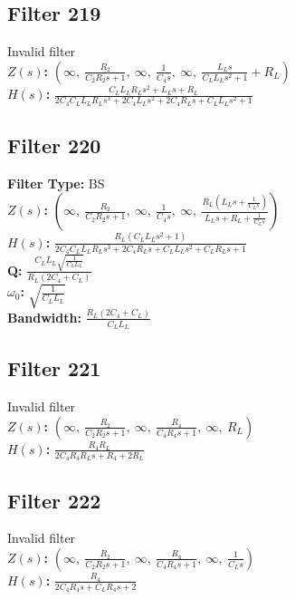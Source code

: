 \documentclass{article}
\begin{document}
\subsection*{Filter 219}
Invalid filter \\ 
\textbf{$Z(s)$:} $\left( \infty, \  \frac{R_{2}}{C_{2} R_{2} s + 1}, \  \infty, \  \frac{1}{C_{4} s}, \  \infty, \  \frac{L_{L} s}{C_{L} L_{L} s^{2} + 1} + R_{L}\right)$ \\ 
\textbf{$H(s)$:} $\frac{C_{L} L_{L} R_{L} s^{2} + L_{L} s + R_{L}}{2 C_{4} C_{L} L_{L} R_{L} s^{3} + 2 C_{4} L_{L} s^{2} + 2 C_{4} R_{L} s + C_{L} L_{L} s^{2} + 1}$ \\ 
\subsection*{Filter 220}
\textbf{Filter Type:} BS \\ 
\textbf{$Z(s)$:} $\left( \infty, \  \frac{R_{2}}{C_{2} R_{2} s + 1}, \  \infty, \  \frac{1}{C_{4} s}, \  \infty, \  \frac{R_{L} \left(L_{L} s + \frac{1}{C_{L} s}\right)}{L_{L} s + R_{L} + \frac{1}{C_{L} s}}\right)$ \\ 
\textbf{$H(s)$:} $\frac{R_{L} \left(C_{L} L_{L} s^{2} + 1\right)}{2 C_{4} C_{L} L_{L} R_{L} s^{3} + 2 C_{4} R_{L} s + C_{L} L_{L} s^{2} + C_{L} R_{L} s + 1}$ \\ 
\textbf{Q:} $\frac{C_{L} L_{L} \sqrt{\frac{1}{C_{L} L_{L}}}}{R_{L} \left(2 C_{4} + C_{L}\right)}$ \\ 
\textbf{$\omega_0$:} $\sqrt{\frac{1}{C_{L} L_{L}}}$ \\ 
\textbf{Bandwidth:} $\frac{R_{L} \left(2 C_{4} + C_{L}\right)}{C_{L} L_{L}}$ \\ 
\subsection*{Filter 221}
Invalid filter \\ 
\textbf{$Z(s)$:} $\left( \infty, \  \frac{R_{2}}{C_{2} R_{2} s + 1}, \  \infty, \  \frac{R_{4}}{C_{4} R_{4} s + 1}, \  \infty, \  R_{L}\right)$ \\ 
\textbf{$H(s)$:} $\frac{R_{4} R_{L}}{2 C_{4} R_{4} R_{L} s + R_{4} + 2 R_{L}}$ \\ 
\subsection*{Filter 222}
Invalid filter \\ 
\textbf{$Z(s)$:} $\left( \infty, \  \frac{R_{2}}{C_{2} R_{2} s + 1}, \  \infty, \  \frac{R_{4}}{C_{4} R_{4} s + 1}, \  \infty, \  \frac{1}{C_{L} s}\right)$ \\ 
\textbf{$H(s)$:} $\frac{R_{4}}{2 C_{4} R_{4} s + C_{L} R_{4} s + 2}$ \\ 
\end{document}
